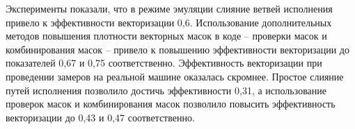Эксперименты показали, что в режиме эмуляции слияние ветвей исполнения привело к эффективности векторизации 0,6.
Использование дополнительных методов повышения плотности векторных масок в коде -- проверки масок и комбинирования масок -- привело к повышению эффективности векторизации до показателей 0,67 и 0,75 соответственно.
Эффективность векторизации при проведении замеров на реальной машине оказалась скромнее.
Простое слияние путей исполнения позволило достичь эффективности 0,31, а использование проверок масок и комбинирования масок позволило повысить эффективность векторизации до 0,43 и 0,47 соответственно.
